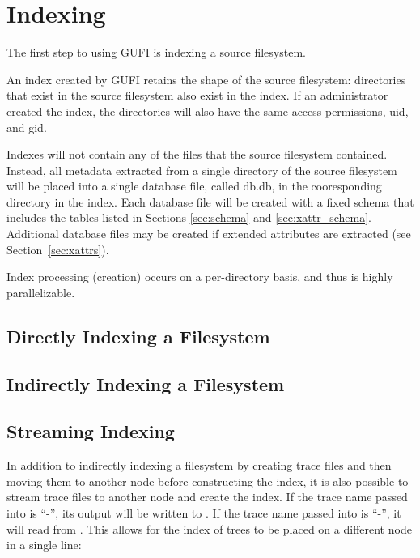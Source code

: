 \section{Indexing}
The first step to using GUFI is indexing a source filesystem.

An index created by GUFI retains the shape of the source filesystem:
directories that exist in the source filesystem also exist in the
index. If an administrator created the index, the directories will
also have the same access permissions, uid, and gid.

Indexes will not contain any of the files that the source filesystem
contained. Instead, all metadata extracted from a single directory of
the source filesystem will be placed into a single database file,
called db.db, in the cooresponding directory in the index. Each
database file will be created with a fixed schema that includes the
tables listed in Sections \ref{sec:schema} and
\ref{sec:xattr_schema}. Additional database files may be created if
extended attributes are extracted (see Section~\ref{sec:xattrs}).

Index processing (creation) occurs on a per-directory basis, and thus
is highly parallelizable.

\subsection{Directly Indexing a Filesystem}

\subsection{Indirectly Indexing a Filesystem}




\subsection{Streaming Indexing}
In addition to indirectly indexing a filesystem by creating trace
files and then moving them to another node before constructing the
index, it is also possible to stream trace files to another node and
create the index. If the trace name passed into \gufidirtrace is
``-'', its output will be written to \stdout. If the trace name passed
into \gufitraceindex is ``-'', it will read from \stdin. This allows
for the index of trees to be placed on a different node in a single
line: \\

